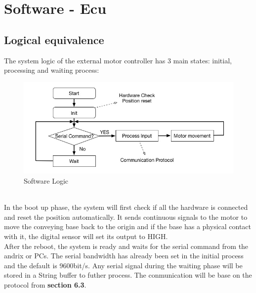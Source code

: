 \documentclass[11pt,a4paper]{article}
\begin{document}
\section{Software - Ecu}
\subsection{Logical equivalence }
The system logic of the external motor controller has 3 main states: initial, processing and waiting process:\\
\begin{figure}[h!]
	\centering
	\includegraphics[scale=0.7]{img/Software-flow.jpg}
	\caption{Software Logic}
	\label{fig:Software logic}
\end{figure}\\

In the boot up phase, the system will first check if all the hardware is connected and reset the position automatically. It sends continuous signals to the motor to move the conveying base back to the origin and if the base has a physical contact with it, the digital sensor will set its output to HIGH.\\

After the reboot, the system is ready and waits for the serial command from the andrix or PCs. The serial bandwidth has already been set in the initial process and the default is 9600bit/s. Any serial signal during the waiting phase will be stored in a String buffer to futher process. The conmunication will be base on the protocol from \textbf{section 6.3}.
\end{document}
